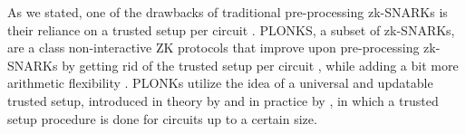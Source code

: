 As we stated, one of the drawbacks of traditional pre-processing zk-SNARKs is their reliance on a trusted setup per circuit \Cir.
PLONKS, a subset of zk-SNARKs, are a class non-interactive ZK protocols that improve upon pre-processing zk-SNARKs by getting rid of the trusted setup per circuit \Cir, while adding a bit more arithmetic flexibility \cite{plonk}. PLONKs utilize the idea of a universal and updatable trusted setup, introduced in theory by \cite{cryptoeprint:2018/280} and in practice by \cite{cryptoeprint:2019/099}, in which a trusted setup procedure is done for circuits up to a certain size. 
